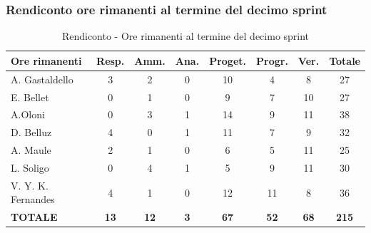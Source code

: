 \documentclass[a4paper,12pt]{article}
\begin{document}
\subsubsection{Rendiconto ore rimanenti al termine del decimo sprint}
\begin{table}[htbp]
\centering
\renewcommand{\arraystretch}{1.5}
\begin{tabularx}{\textwidth}{|X|c|c|c|c|c|c|c|}
\hline
\textbf{Ore rimanenti} & \textbf{Resp.} & \textbf{Amm.} & \textbf{Ana.} & \textbf{Proget.} & \textbf{Progr.} & \textbf{Ver.} & \textbf{Totale} \\
\hline
A. Gastaldello & 3 & 2 & 0 & 10 & 4 & 8 & 27 \\
\hline
E. Bellet & 0 & 1 & 0 & 9 & 7 & 10 & 27 \\
\hline
A.Oloni & 0 & 3 & 1 & 14 & 9 & 11 & 38 \\
\hline
D. Belluz & 4 & 0 & 1 & 11 & 7 & 9 & 32 \\
\hline
A. Maule & 2 & 1 & 0 & 6 & 5 & 11 & 25 \\
\hline
L. Soligo & 0 & 4 & 1 & 5 & 9 & 11 & 30 \\
\hline
V. Y. K. Fernandes & 4 & 1 & 0 & 12 & 11 & 8 & 36 \\
\hline
\rowcolor{gray!20}
\textbf{TOTALE} & \textbf{13} & \textbf{12} & \textbf{3} & \textbf{67} & \textbf{52} & \textbf{68} & \textbf{215} \\
\hline
\end{tabularx}
\caption{Rendiconto - Ore rimanenti al termine del decimo sprint}
\end{table}
\end{document}
